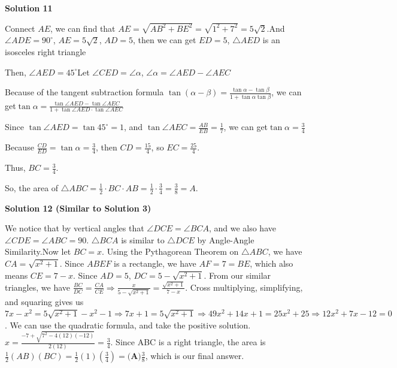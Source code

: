 \begin{enumerate}
 



\textbf{Solution 11}

Connect $AE$, we can find that $AE=\sqrt{AB^2+BE^2}=\sqrt{1^2+7^2}=5\sqrt{2}$.And $\angle ADE=90^\circ$, $AE=5\sqrt{2}$, $AD=5$, then we can get $ED=5$, $\triangle AED$ is an isosceles right triangle 

 Then, $\angle AED=45^\circ$Let $\angle CED=\angle \alpha$, $\angle \alpha=\angle AED-\angle AEC$

 Because of the tangent subtraction formula $\tan(\alpha-\beta)=\frac{\tan\alpha-\tan\beta}{1+\tan\alpha\tan\beta}$, we can get$\tan\alpha=\frac{\tan\angle AED-\tan\angle AEC}{1+\tan\angle AED\cdot\tan\angle AEC}$

 Since $\tan\angle AED=\tan 45^\circ=1$, and $\tan\angle AEC=\frac{AB}{EB}=\frac{1}{7}$, we can get$\tan\alpha=\frac{3}{4}$

 Because $\frac{CD}{ED}=\tan\alpha=\frac{3}{4}$, then $CD=\frac{15}{4}$, so $EC=\frac{25}{4}$.

 Thus, $BC=\frac{3}{4}$.

 So, the area of $\triangle ABC=\frac{1}{2}\cdot BC\cdot AB=\frac{1}{2}\cdot\frac{3}{4}=\frac{3}{8}=\boxed{A}$.

 



\textbf{Solution 12 (Similar to Solution 3)}

We notice that by vertical angles that $\angle DCE = \angle BCA$, and we also have $\angle CDE = \angle ABC = 90$. $\triangle BCA$ is similar to $\triangle DCE$ by Angle-Angle Similarity.Now let $BC = x$. Using the Pythagorean Theorem on $\triangle ABC$, we have $CA = \sqrt{x^2 + 1}$. Since $ABEF$ is a rectangle, we have $AF = 7 = BE$, which also means $CE = 7 - x$. Since $AD = 5$, $DC = 5 - \sqrt{x^2 + 1}$. From our similar triangles, we have $\frac{BC}{DC} = \frac{CA}{CE} \Longrightarrow \frac{x}{5 - \sqrt{x^2 + 1}} = \frac{\sqrt{x^2 + 1}}{7-x}$. Cross multiplying, simplifying, and squaring gives us $7x - x^2 = 5\sqrt{x^2 + 1} - x^2 - 1 \Longrightarrow 7x + 1 = 5\sqrt{x^2 + 1} \Longrightarrow 49x^2 + 14x + 1 = 25x^2 + 25 \Longrightarrow 12x^2 + 7x - 12 = 0$. We can use the quadratic formula, and take the positive solution. $x = \frac{-7 + \sqrt{7^2 - 4(12)(-12)}}{2(12)} = \frac{3}{4}$. Since ABC is a right triangle, the area is $\frac{1}{2} (AB)(BC) = \frac{1}{2} (1)(\frac{3}{4}) = \boxed{\textbf{(A)} \frac{3}{8}}$, which is our final answer.

 




\end{enumerate}
